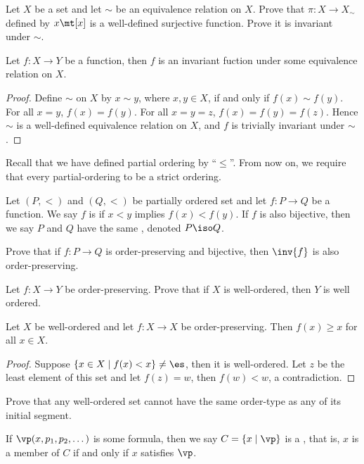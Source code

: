 \documentclass[10pt]{article}
\begin{document}
\begin{problem}
    Let $X$ be a set and let $\sim$ be an equivalence relation on $X$. Prove that $\pi:X\to{X}_{\sim}$ defined by $x\mt[x]$ is a well-defined surjective function. Prove it is invariant under $\sim$.
\end{problem}
\begin{proposition}
    Let $f:X\to Y$ be a function, then $f$ is an invariant fuction under some equivalence relation on $X$.
\end{proposition}
\begin{proof}
    Define $\sim$ on $X$ by $x\sim y$, where $x,y\in X$, if and only if $f(x)\sim f(y)$. For all $x=y$, $f(x)=f(y)$. For all $x=y=z$, $f(x)=f(y)=f(z)$. Hence $\sim$ is a well-defined equivalence relation on $X$, and $f$ is trivially invariant under $\sim$.
\end{proof} 
\par
Recall that we have defined partial ordering by ``$\le$''. From now on, we require that every partial-ordering to be a strict ordering.
\begin{definition}
    Let $(P,<)$ and $(Q,<)$ be partially ordered set and let $f:P\to Q$ be a function. We say $f$ is  if $x<y$ implies $f(x)<f(y)$. If $f$ is also bijective, then we say $P$ and $Q$ have the same , denoted $P\iso Q$.
\end{definition}
\begin{problem}
    Prove that if $f:P\to Q$ is order-preserving and bijective, then $\inv{f}$ is also order-preserving.
\end{problem}
\begin{problem}
    Let $f:X\to Y$ be order-preserving. Prove that if $X$ is well-ordered, then $Y$ is well ordered.
\end{problem}
\begin{proposition}
    Let $X$ be well-ordered and let $f:X\to X$ be order-preserving. Then $f(x)\ge x$ for all $x\in X$.
\end{proposition}
\begin{proof}
    Suppose $\{x\in X\mid f(x)<x\}\ne\es$, then it is well-ordered. Let $z$ be the least element of this set and let $f(z)=w$, then $f(w)<w$, a contradiction.
\end{proof}
\begin{problem}
    Prove that any well-ordered set cannot have the same order-type as any of its initial segment.
\end{problem}
\begin{definition}
    If $\vp(x,{p}_{1},{p}_{2},\dots)$ is some formula, then we say $C=\{x\mid\vp\}$ is a , that is, $x$ is a member of $C$ if and only if $x$ satisfies $\vp$.
\end{definition}
\end{document}
